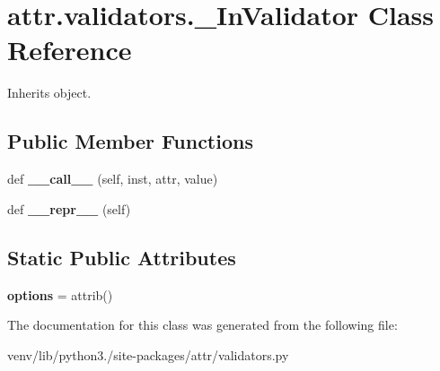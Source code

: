 \hypertarget{classattr_1_1validators_1_1___in_validator}{}\section{attr.\+validators.\+\_\+\+In\+Validator Class Reference}
\label{classattr_1_1validators_1_1___in_validator}


Inherits object.

\subsection*{Public Member Functions}
\begin{DoxyCompactItemize}
\item 
\mbox{\label{classattr_1_1validators_1_1___in_validator_ad857a557079d6eab6b9cd7c714e0dc52}} 
def {\bfseries \+\_\+\+\_\+call\+\_\+\+\_\+} (self, inst, attr, value)
\item 
\mbox{\label{classattr_1_1validators_1_1___in_validator_a884f7ef5d2133d984e21965f2c54baae}} 
def {\bfseries \+\_\+\+\_\+repr\+\_\+\+\_\+} (self)
\end{DoxyCompactItemize}
\subsection*{Static Public Attributes}
\begin{DoxyCompactItemize}
\item 
\mbox{\label{classattr_1_1validators_1_1___in_validator_a1e5720e634f2c1ccff7e0c8c7b1da516}} 
{\bfseries options} = attrib()
\end{DoxyCompactItemize}


The documentation for this class was generated from the following file\+:\begin{DoxyCompactItemize}
\item 
venv/lib/python3./site-\/packages/attr/validators.\+py\end{DoxyCompactItemize}
